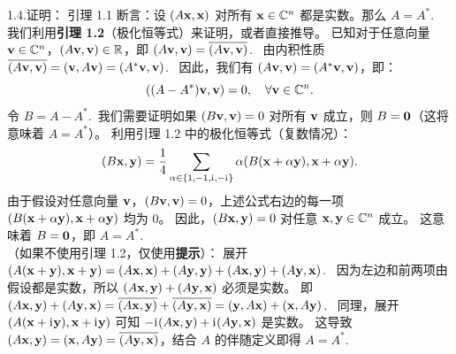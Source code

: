 \begin{exer}
1.4.证明：
引理 1.1 断言：设 $(A\xx, \xx)$ 对所有 $\xx \in \CC^n$ 都是实数。那么 $A = A^*$.~
\\
我们利用\textbf{引理 1.2}（极化恒等式）来证明，或者直接推导。
已知对于任意向量 $\vv \in \CC^n$，$(A\vv, \vv) \in \RR$，即 $(A\vv, \vv) = \overline{(A\vv, \vv)}$.~
由内积性质 $\overline{(A\vv, \vv)} = (\vv, A\vv) = (A^*\vv, \vv)$.~
因此，我们有 $(A\vv, \vv) = (A^*\vv, \vv)$，即：
$$ ((A - A^*)\vv, \vv) = 0, \quad \forall \vv \in \CC^n. $$
令 $B = A - A^*$.~我们需要证明如果 $(B\vv, \vv) = 0$ 对所有 $\vv$ 成立，则 $B = \oo$（这将意味着 $A = A^*$）。
利用引理 1.2 中的极化恒等式（复数情况）：
$$ (B\xx, \yy) = \frac{1}{4} \sum_{\alpha \in \{1, -1, \ii, -\ii\}} \alpha (B(\xx + \alpha\yy), \xx + \alpha\yy). $$
由于假设对任意向量 $\vv$，$(B\vv, \vv) = 0$，上述公式右边的每一项 $(B(\xx + \alpha\yy), \xx + \alpha\yy)$ 均为 0。
因此，$(B\xx, \yy) = 0$ 对任意 $\xx, \yy \in \CC^n$ 成立。
这意味着 $B = \oo$，即 $A = A^*$.~
\\
（如果不使用引理 1.2，仅使用\textbf{提示}）：
展开 $(A(\xx+\yy), \xx+\yy) = (A\xx, \xx) + (A\yy, \yy) + (A\xx, \yy) + (A\yy, \xx)$.~
因为左边和前两项由假设都是实数，所以 $(A\xx, \yy) + (A\yy, \xx)$ 必须是实数。
即 $(A\xx, \yy) + (A\yy, \xx) = \overline{(A\xx, \yy)} + \overline{(A\yy, \xx)} = (\yy, A\xx) + (\xx, A\yy)$.~
同理，展开 $(A(\xx+\ii\yy), \xx+\ii\yy)$ 可知 $-\ii(A\xx, \yy) + \ii(A\yy, \xx)$ 是实数。
这导致 $(A\xx, \yy) = (\xx, A\yy) = \overline{(A\yy, \xx)}$，结合 $A$ 的伴随定义即得 $A=A^*$.~


\vspace{5ex}


\end{exer}
